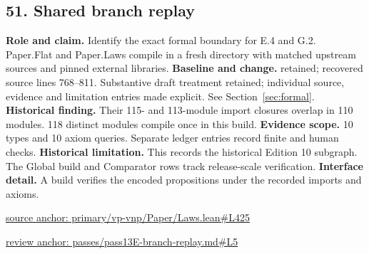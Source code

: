 \documentclass[11pt,letterpaper]{article}
\theoremstyle{definition}\newtheorem{definition}[theorem]{Definition}\newtheorem{example}[theorem]{Example}
\theoremstyle{remark}\newtheorem{remark}[theorem]{Remark}
\begin{document}
\subsection*{51. Shared branch replay}
\textbf{Role and claim.} Identify the exact formal boundary for E.4 and G.2. Paper.Flat and Paper.Laws compile in a fresh directory with matched upstream sources and pinned external libraries.
\textbf{Baseline and change.} retained; recovered source lines 768--811. Substantive draft treatment retained; individual source, evidence and limitation entries made explicit. See Section~\ref{sec:formal}.
\textbf{Historical finding.} Their 115- and 113-module import closures overlap in 110 modules. 118 distinct modules compile once in this build.
\textbf{Evidence scope.} 10 types and 10 axiom queries. Separate ledger entries record finite and human checks.
\textbf{Historical limitation.} This records the historical Edition 10 subgraph. The Global build and Comparator rows track release-scale verification.
\textbf{Interface detail.} A build verifies the encoded propositions under the recorded imports and axioms.
\par\href{https://github.com/nousentllc/VP-VNP-Review/blob/8a7976933b6b2b4ffda1ad3a0dfb5fc6b6f023e8/primary/vp-vnp/Paper/Laws.lean\#L425}{source anchor: primary/vp-vnp/Paper/Laws.lean\#L425}
\par\href{https://github.com/nousentllc/VP-VNP-Review/blob/8a7976933b6b2b4ffda1ad3a0dfb5fc6b6f023e8/passes/pass13E-branch-replay.md\#L5}{review anchor: passes/pass13E-branch-replay.md\#L5}
\goodbreak
\end{document}
